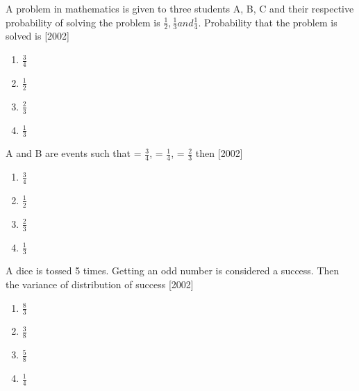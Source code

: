 \iffalse
\title{Assignment 2}
\author{Teja Vardhan}
\section{mains}
\fi

    \item A problem in mathematics is given to three students A, B, C and their respective probability of solving the problem is $\frac{1}{2}, \frac{1}{3} and \frac{1}{4}$. Probability that the problem is solved is  \hfill [2002]

        \begin{multicols}{4}
        \begin{enumerate}
            \item $\frac{3}{4}$
            \item $\frac{1}{2}$
            \item $\frac{2}{3}$
            \item $\frac{1}{3}$   
        \end{enumerate}
        \end{multicols}
        


    \item A and B are events such that  = $\frac{3}{4}$,  = $\frac{1}{4}$,  = $\frac{2}{3}$ then  \hfill [2002]

        \begin{multicols}{4}
        \begin{enumerate}
            \item $\frac{3}{4}$
            \item $\frac{1}{2}$
            \item $\frac{2}{3}$
            \item $\frac{1}{3}$
        \end{enumerate}
        \end{multicols}


    \item A dice is tossed 5 times. Getting an odd number is considered a success. Then the variance of distribution of success \hfill [2002]

        \begin{multicols}{4}
        \begin{enumerate}
            \item $\frac{8}{3}$
            \item $\frac{3}{8}$
            \item $\frac{5}{8}$
            \item $\frac{1}{4}$   
        \end{enumerate}
        \end{multicols}
        

